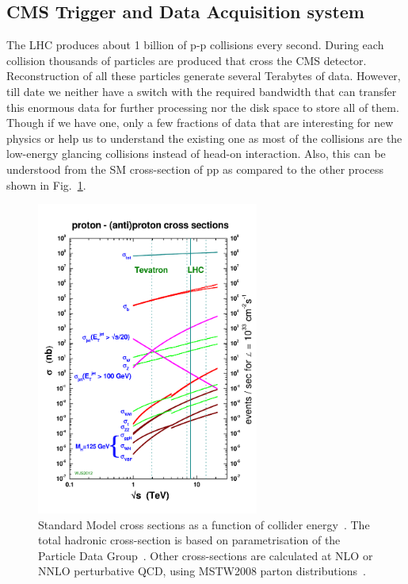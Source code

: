 \subsection{CMS Trigger and Data Acquisition system} %
\label{sub:cms_trigger_and_data_acquisition_system}
The LHC produces about 1 billion of p-p collisions every second.
During each collision thousands of particles are produced that cross the CMS detector.
Reconstruction of all these particles generate several Terabytes of data.
However, till date we neither have a switch with the required bandwidth that can transfer this enormous data for further processing nor the disk space to store all of them.
Though if we have one, only a few fractions of data that are interesting for new physics or help us to understand the existing one as most of the collisions are the low-energy glancing collisions instead of head-on interaction.
Also, this can be understood from the SM cross-section of pp as compared to the other process shown in Fig.~\ref{fig:SM-cross-section}.
\begin{figure}[!htbp]
	\centering
	\includegraphics[width=0.65\textwidth]{figures/LHC/crosssections2012_v5.pdf}
	\caption{Standard Model cross sections as a function of collider energy~\cite{Stirling2012}. The total hadronic cross-section is based on parametrisation of the Particle Data Group~\cite{PDG2018}. Other cross-sections are calculated at NLO or NNLO perturbative QCD, using MSTW2008 parton distributions~\cite{Martin2009}.}
	\label{fig:SM-cross-section}
\end{figure}
